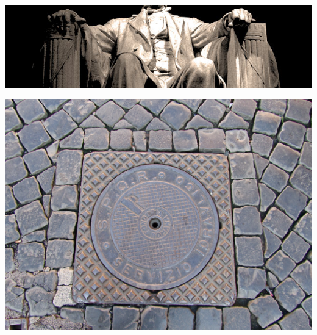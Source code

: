 \begin{frame}
    \centering
    \includegraphics[width=.9\textwidth]{img/fasces/lincoln_fasces.jpg} \\
\end{frame}
\begin{frame}
    \centering
    \includegraphics[width=.9\textwidth]{img/fasces/manhole.JPG} \\
\end{frame}

